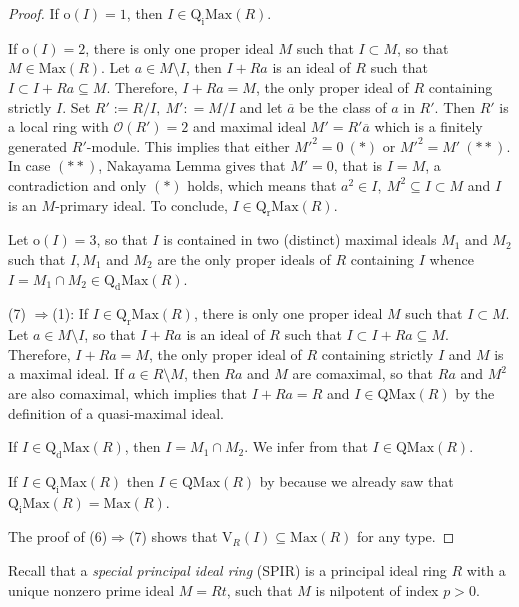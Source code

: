 \documentclass[12pt,leqno]{amsart}
\theoremstyle{definition}
\begin{document}
\begin{proof}
If $\mathrm o(I)=1$, then $I\in\mathrm{Q_iMax}( R)$. 

If $\mathrm o(I)=2$, there is only one proper ideal $M$ such that $I\subset M$, so that $M\in\mathrm{Max}(R)$. Let $a\in M\setminus I$, then $I+Ra$ is an ideal of $R$ such that $I\subset I+Ra\subseteq M$. Therefore, $I+Ra =M$, the only proper ideal of $R$ containing strictly $I$. Set $R':= R/I,\ M': =M/I$ and let $\overline a$ be the class of $a$ in $R'$. Then $R'$ is a local ring with $\mathcal O(R')=2$ and maximal ideal $M'= R'\overline a$ which is a finitely generated $R'$-module. This implies that either $M'^2=0\ (*)$ or $M'^2=M'\ (**)$. In case $(**)$, Nakayama Lemma gives that $M'=0$, that is $I=M$, a contradiction and only $(*)$ holds, which means that $a^2 \in I,\ M^2\subseteq I\subset M$ and $I$ is an $M$-primary ideal. To conclude, $I\in\mathrm{Q_rMax}( R)$. 
 
Let $\mathrm o(I)=3$, so that $I$ is contained in two (distinct) maximal ideals $M_1$ and $M_2$ such that $I,M_1$ and $M_2$ are the only proper ideals of $R$ containing $I$ whence $I=M_1\cap M_2\in\mathrm {Q_dMax}( R)$. 
  
(7) $\Rightarrow$(1): If $I\in\mathrm{Q_rMax}(R)$, there is only one proper ideal $M$ such that $I\subset M$. Let $a\in M\setminus I$, so that $I+Ra$ is an ideal of $R$ such that $I\subset I+Ra\subseteq M$. Therefore, $I+Ra =M$, the only proper ideal of $R$ containing strictly $I$ and $M$ is a maximal ideal. If $a\in R\setminus M$, then $Ra$ and $M$ are comaximal, so that $Ra$ and $M^2$ are also comaximal, which implies that $I+Ra=R$ and $I\in\mathrm{QMax}(R)$ by the definition of a quasi-maximal ideal.

If $I\in\mathrm{Q_dMax}( R)$, then $I=M_1\cap M_2$. We infer from \cite[Remark 2]{AKKT} that $I\in\mathrm{QMax}(R)$.

If $I\in\mathrm{Q_iMax}(R)$ then $I\in\mathrm{QMax}(R)$ by \cite[Proposition 3]{AKKT} because we already saw that $\mathrm{Q_iMax}(R)=\mathrm{Max}(R)$. 

The proof of (6)$\Rightarrow$(7) shows that $\mathrm{V}_R(I)\subseteq\mathrm{Max}(R)$ for any type.
 \end{proof}

Recall that a {\it special principal ideal ring} (SPIR) is a principal ideal ring $R$ with a unique nonzero prime ideal $M=Rt$, such that $M$ is nilpotent of index $p>0$.
\end{document}
